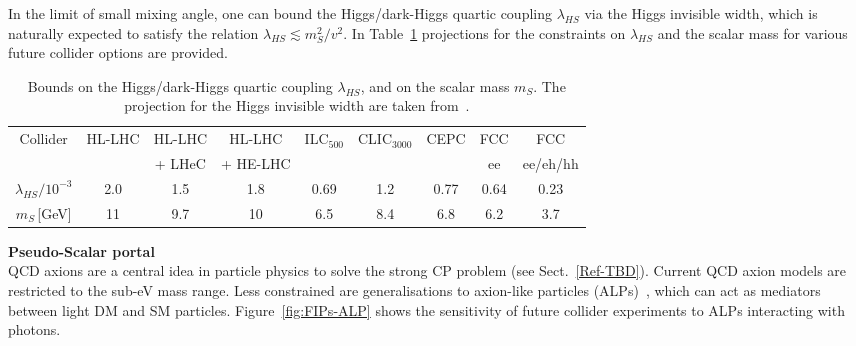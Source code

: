 \documentclass[../report.tex]{subfiles}
\begin{document}
\vskip 2mm
\noindent
In the limit of small mixing angle, one can bound the Higgs/dark-Higgs quartic coupling $\lambda_{HS}$ via the Higgs invisible width, which is naturally expected to satisfy the relation $\lambda_{HS}\lesssim m_S^2/v^2$. 
In Table~\ref{table:scalarInv} projections for the constraints on $\lambda_{HS}$ and the scalar mass for various future collider options are provided. 

\begin{table}[h!]
\caption{\small Bounds on the Higgs/dark-Higgs quartic coupling $\lambda_{HS}$, and on the scalar mass $m_S$. The projection for the Higgs invisible width are taken from~\cite{deBlas:2019rxi}.}
\begin{center}
 \begin{tabular}{|c| c c c c c c c c|} 
 \hline
  Collider &{\small HL-LHC} & {\small HL-LHC}& {\small HL-LHC} &  {\small ILC$_{500}$}& {\small  CLIC$_{3000}$}&{\small CEPC} & {\small FCC} & {\small FCC} \\
   & &  {\small + LHeC} &  {\small + HE-LHC} & & & & {\small ee} & {\small ee/eh/hh}
 \\ [0.5ex] 
 \hline\hline
 ${\lambda_{HS}/{10^{-3}}}$ & 2.0& 1.5& 1.8& 0.69& 1.2& 0.77& 0.64& 0.23 \\ 
 \hline
$m_S\,$[GeV] & 11& 9.7& 10& 6.5& 8.4& 6.8& 6.2& 3.7\\
 \hline

\end{tabular}
\end{center}
\label{table:scalarInv}
\end{table}
%
\vskip 2mm
\noindent
{\bf Pseudo-Scalar portal} \\
QCD axions are a central idea in particle physics 
to solve the strong CP problem (see Sect.~\ref{Ref-TBD}).
Current QCD axion models are restricted to the sub-eV mass range. Less constrained are generalisations to axion-like particles (ALPs)~\cite{Jaeckel:2010ni}, which can act as
mediators between light DM and SM particles.
Figure~\ref{fig:FIPs-ALP} shows the sensitivity of future collider experiments to ALPs interacting with photons. 
\end{document}
